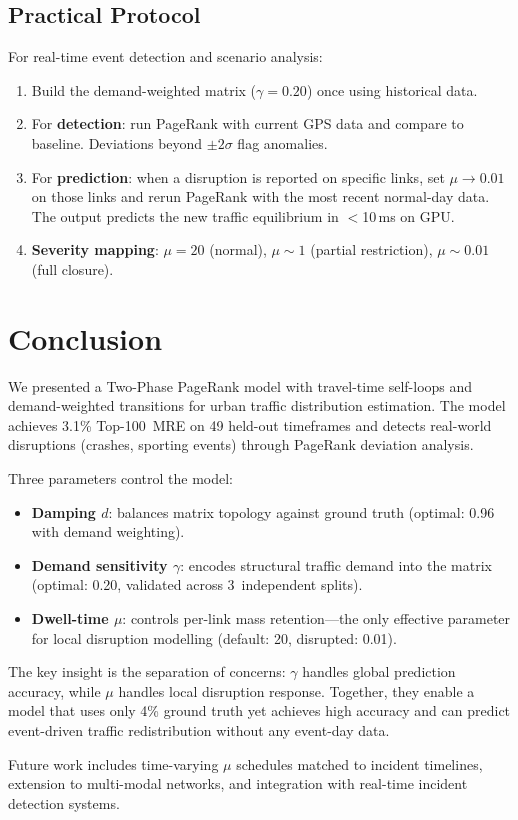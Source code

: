 \documentclass[11pt]{article}
\begin{document}
\subsection{Practical Protocol}

For real-time event detection and scenario analysis:
\begin{enumerate}
    \item Build the demand-weighted matrix ($\gamma = 0.20$) once using historical data.
    \item For \textbf{detection}: run PageRank with current GPS data and compare to baseline. Deviations beyond $\pm 2\sigma$ flag anomalies.
    \item For \textbf{prediction}: when a disruption is reported on specific links, set $\mu \to 0.01$ on those links and rerun PageRank with the most recent normal-day data. The output predicts the new traffic equilibrium in $<$10\,ms on GPU.
    \item \textbf{Severity mapping}: $\mu = 20$ (normal), $\mu \sim 1$ (partial restriction), $\mu \sim 0.01$ (full closure).
\end{enumerate}


\section{Conclusion}
\label{sec:conclusion}

We presented a Two-Phase PageRank model with travel-time self-loops and demand-weighted transitions for urban traffic distribution estimation.
The model achieves 3.1\% Top-100~MRE on 49 held-out timeframes and detects real-world disruptions (crashes, sporting events) through PageRank deviation analysis.

Three parameters control the model:
\begin{itemize}
    \item \textbf{Damping $d$}: balances matrix topology against ground truth (optimal: 0.96 with demand weighting).
    \item \textbf{Demand sensitivity $\gamma$}: encodes structural traffic demand into the matrix (optimal: 0.20, validated across 3~independent splits).
    \item \textbf{Dwell-time $\mu$}: controls per-link mass retention---the only effective parameter for local disruption modelling (default: 20, disrupted: 0.01).
\end{itemize}

The key insight is the separation of concerns: $\gamma$ handles global prediction accuracy, while $\mu$ handles local disruption response.
Together, they enable a model that uses only 4\% ground truth yet achieves high accuracy and can predict event-driven traffic redistribution without any event-day data.

Future work includes time-varying $\mu$ schedules matched to incident timelines, extension to multi-modal networks, and integration with real-time incident detection systems.



\end{document}
